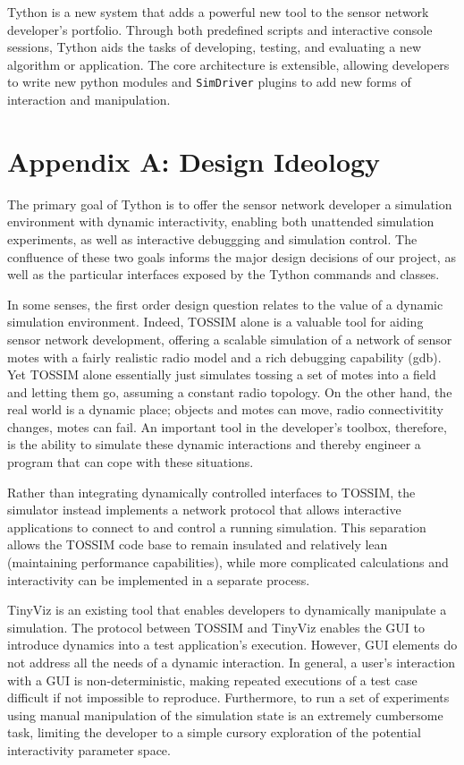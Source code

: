 \documentclass[10pt]{article}
\newcommand{\name}{{Tython}\xspace}
\begin{document}
\name is a new system that adds a powerful new tool to the sensor
network developer's portfolio. Through both predefined scripts and
interactive console sessions, \name aids the tasks of developing,
testing, and evaluating a new algorithm or application. The core
architecture is extensible, allowing developers to write new python
modules and {\tt SimDriver} plugins to add new forms of interaction
and manipulation.

\newpage
\section{Appendix A: Design Ideology}

The primary goal of \name is to offer the sensor network developer a
simulation environment with dynamic interactivity, enabling both
unattended simulation experiments, as well as interactive debuggging
and simulation control. The confluence of these two goals informs the
major design decisions of our project, as well as the particular
interfaces exposed by the \name commands and classes.

In some senses, the first order design question relates to the value
of a dynamic simulation environment. Indeed, TOSSIM alone is a
valuable tool for aiding sensor network development, offering a
scalable simulation of a network of sensor motes with a fairly
realistic radio model and a rich debugging capability (gdb). Yet
TOSSIM alone essentially just simulates tossing a set of motes into a
field and letting them go, assuming a constant radio topology. On the
other hand, the real world is a dynamic place; objects and motes can
move, radio connectivitity changes, motes can fail. An important tool
in the developer's toolbox, therefore, is the ability to simulate
these dynamic interactions and thereby engineer a program that can
cope with these situations.

Rather than integrating dynamically controlled interfaces to TOSSIM,
the simulator instead implements a network protocol that allows
interactive applications to connect to and control a running
simulation. This separation allows the TOSSIM code base to remain
insulated and relatively lean (maintaining performance capabilities),
while more complicated calculations and interactivity can be
implemented in a separate process.

TinyViz is an existing tool that enables developers to dynamically
manipulate a simulation. The protocol between TOSSIM and TinyViz
enables the GUI to introduce dynamics into a test application's
execution. However, GUI elements do not address all the needs of a
dynamic interaction. In general, a user's interaction with a GUI is
non-deterministic, making repeated executions of a test case difficult
if not impossible to reproduce. Furthermore, to run a set of
experiments using manual manipulation of the simulation state is an
extremely cumbersome task, limiting the developer to a simple cursory
exploration of the potential interactivity parameter space.
\end{document}
